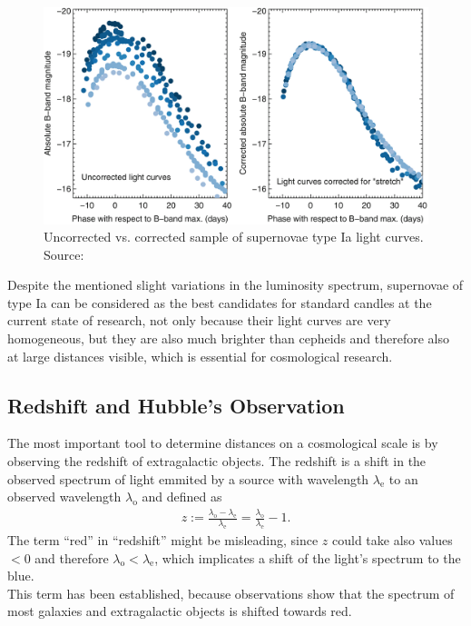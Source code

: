 \begin{figure}[H]
    \centering
    \includegraphics[scale=0.35]{figures/images/supernovae-stretch.png}
    \caption{Uncorrected vs. corrected sample of supernovae type Ia light curves. \\ 
    Source: \cite[p.~298, Figure 2]{Maguire2017}} 
\end{figure}

\noindent Despite the mentioned slight variations in the luminosity spectrum, supernovae of type Ia can be considered as the best candidates for standard candles at the current state of research, not only because their light curves are very homogeneous, but they are also much brighter than cepheids and therefore also at large distances visible, which is essential for cosmological research.


\subsection{Redshift and Hubble's Observation}

The most important tool to determine distances on a cosmological scale is by observing the redshift of extragalactic objects. The redshift is a shift in the observed spectrum of light emmited by a source with wavelength $\lambda_{\text{e}}$ to an observed wavelength $\lambda_{\text{o}}$ and defined as
\begin{align}
    z := \frac{\lambda_{\text{o}} - \lambda_{\text{e}}}{\lambda_{\text{e}}} = \frac{\lambda_{\text{o}}}{\lambda_{\text{e}}} - 1. \label{eq:redshift}
\end{align}
The term ``red'' in ``redshift'' might be misleading, since $z$ could take also values $<0$ and therefore $\lambda_{\text{o}} < \lambda_{\text{e}}$, which implicates a shift of the light's spectrum to the blue. \\
This term has been established, because observations show that the spectrum of most galaxies and extragalactic objects is shifted towards red. \\

